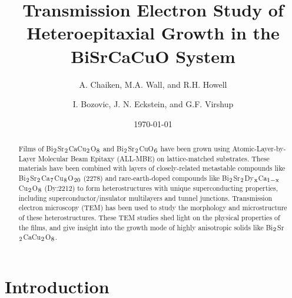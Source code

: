 

\title{Transmission Electron Study of Heteroepitaxial Growth in the
BiSrCaCuO System}

\author{A. Chaiken,  M.A. Wall, and R.H. Howell}
\address{Materials Science and Technology Division\\
Lawrence Livermore National Laboratory\\
Livermore, CA 94550}

\author{I. Bozovic, J. N. Eckstein, and G.F. Virshup}
\address{E. L. Ginzton Research Laboratory\\
Varian Associates, Inc.\\
Palo Alto, CA 94304-1025}
\date{\today}

\maketitle 

\begin{abstract}
Films of Bi$\rm _2$Sr$\rm _2$CaCu$\rm _2$O$\rm _8$ and Bi$\rm _2$Sr$\rm
_2$CuO$\rm _6$ have been grown using Atomic-Layer-by-Layer Molecular
Beam Epitaxy (ALL-MBE) on lattice-matched substrates.  These materials
have been combined with layers of closely-related metastable compounds
like Bi$\rm _2$Sr$\rm _2$Ca$\rm _7$Cu$\rm _8$O$\rm _{20}$ (2278) and
rare-earth-doped compounds like Bi$\rm _2$Sr$\rm _2$Dy$\rm _x$Ca$\rm
_{1-x}$Cu$\rm _2$O$\rm _8$ (Dy:2212) to form heterostructures with
unique superconducting properties, including superconductor/insulator
multilayers and tunnel junctions.  Transmission electron microscopy
(TEM) has been used to study the morphology and microstructure of
these heterostructures.  These TEM studies shed light on the physical
properties of the films, and give insight into the growth mode of
highly anisotropic solids like Bi$\rm _2$Sr$\rm _2$CaCu$\rm _2$O$\rm _8$.
\end{abstract}


\section{Introduction}

